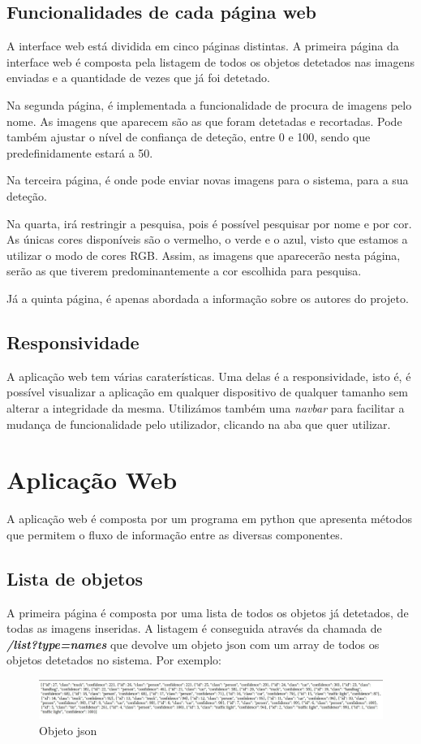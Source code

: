 \documentclass{report}
\begin{document}
\section{Funcionalidades de cada página web}
A interface web está dividida em cinco páginas distintas. A primeira página da interface web é composta pela listagem de todos os objetos detetados nas imagens enviadas e a quantidade de vezes que já foi detetado.\par Na segunda página, é implementada a funcionalidade de procura de imagens pelo nome. As imagens que aparecem são as que foram detetadas e recortadas. Pode também ajustar o nível de confiança de deteção, entre 0 e 100, sendo que predefinidamente estará a 50. \par Na terceira página, é onde pode enviar novas imagens para o sistema, para a sua deteção. \par Na quarta, irá restringir a pesquisa, pois é possível pesquisar por nome e por cor. As únicas cores disponíveis são o vermelho, o verde e o azul, visto que estamos a utilizar o modo de cores RGB. Assim, as imagens que aparecerão nesta página, serão as que tiverem predominantemente a cor escolhida para pesquisa. \par Já a quinta página, é apenas abordada a informação sobre os autores do projeto.

\section{Responsividade}
A aplicação web tem várias caraterísticas. Uma delas é a responsividade, isto é, é possível visualizar a aplicação em qualquer dispositivo de qualquer tamanho sem alterar a integridade da mesma. Utilizámos também uma \textit{navbar} para facilitar a mudança de funcionalidade pelo utilizador, clicando na aba que quer utilizar.


\chapter{Aplicação Web}
\label{chap.aplicacaoweb}
A aplicação web é composta por um programa em python que apresenta métodos que permitem o fluxo de informação entre as diversas componentes.

\section{Lista de objetos}
A primeira página é composta por uma lista de todos os objetos já detetados, de todas as imagens inseridas. A listagem é conseguida através da chamada de \textbf{\textit{/list?type=names }} que devolve um objeto \ac{json} com um array de todos os objetos detetados no sistema. Por exemplo: 
\vspace{5 mm}
\begin{figure}[!ht]
    \centering
    \includegraphics[scale = 0.3]{foto.jpg}
    \caption{Objeto \ac{json}}
    \label{fig:my_label}
\end{figure}
\end{document}
